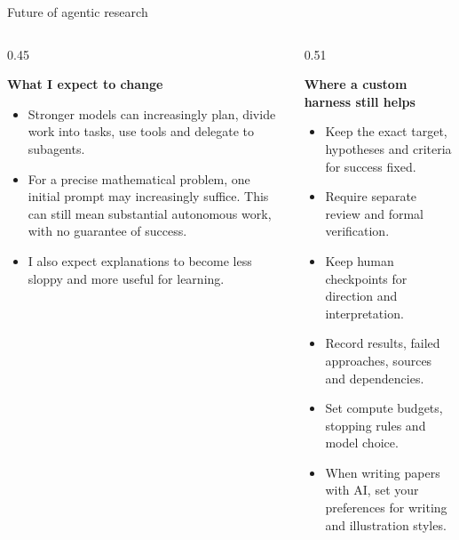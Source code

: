 \documentclass[11pt,aspectratio=169]{beamer}
\begin{document}
\begin{frame}[t]{Future of agentic research}
  \vspace{-1mm}
  \begin{columns}[T,onlytextwidth]
    \begin{column}{0.45\textwidth}
      {\fontsize{10.5}{12}\selectfont\bfseries
        What I expect to change\par}
      \vspace{2mm}
         {\fontsize{8.8}{10.5}\selectfont
        \begin{itemize}
        \setlength{\itemsep}{0.5mm}
            \item  Stronger models can increasingly plan, divide work into tasks,
        use tools and delegate to subagents.
        \item For a precise mathematical problem, one initial prompt may
        increasingly suffice. This can still mean substantial autonomous
        work, with no guarantee of success.
        \item 
        I also expect explanations to become less sloppy and more
        useful for learning.
        \end{itemize}
      \vspace{2mm}}
    \end{column}
    \begin{column}{0.51\textwidth}
      {\fontsize{10.5}{12}\selectfont\bfseries
        Where a custom harness still helps\par}
      \vspace{2mm}
      {\fontsize{8.8}{10.5}\selectfont
      \begin{itemize}
        \setlength{\itemsep}{0.5mm}
        \item Keep the exact target, hypotheses and criteria for success fixed.
        \item Require separate review and formal verification.
        \item Keep human checkpoints for direction and interpretation.
        \item Record results, failed approaches, sources and dependencies.
        \item Set compute budgets, stopping rules and model choice.
        \item When writing papers with AI, set your preferences for writing
          and illustration styles.
      \end{itemize}}
    \end{column}
  \end{columns}

\end{frame}
\end{document}
